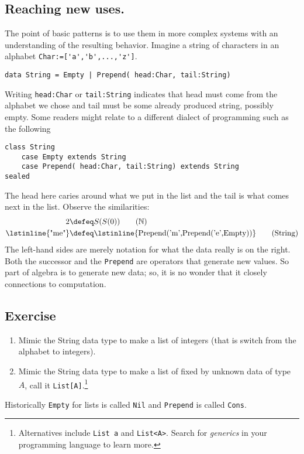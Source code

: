 \subsection{Reaching new uses.}

The point of basic patterns is to use them in more complex systems
with an understanding of the resulting behavior.  Imagine a string 
of characters in an alphabet \lstinline{Char:=['a','b',...,'z']}.
\begin{lstlisting}[language=Hidris]
data String = Empty | Prepend( head:Char, tail:String) 
\end{lstlisting}
Writing \lstinline{head:Char} or \lstinline{tail:String} 
indicates that head must come from the alphabet we chose 
and tail must be some already produced string, possibly empty.
Some readers might relate to a different dialect of 
programming such as the following
\begin{lstlisting}[language=Sava]
class String
    case Empty extends String
    case Prepend( head:Char, tail:String) extends String
sealed
\end{lstlisting}
The head here caries around what we put in the list and the tail 
is what comes next in the list.  Observe the similarities:
\begin{align}
     2 & \defeq S(S(0)) \tag{$\mathbb{N}$}\\
 \text{\lstinline{"me"}} & \defeq \text{\lstinline{Prepend('m',Prepend('e',Empty))}}
\tag{String}
\end{align}
The left-hand sides are merely notation for what the data really is on the right.
Both the successor and the \lstinline{Prepend} are operators that generate 
new values.  So part of algebra is to generate new data; so, it is no wonder 
that it closely connections to computation.

\subsection*{Exercise}
\begin{enumerate}
    \item Mimic the String data type to make a list of integers (that is 
    switch from the alphabet to integers).

    \item Mimic the String data type to make a list of fixed by 
    unknown data of type $A$, call it \lstinline{List[A]}.\footnote{
    Alternatives include \lstinline{List a} and \lstinline{List<A>}. 
    Search for \emph{generics} in your programming language to learn more.
    }

\end{enumerate}
Historically \lstinline{Empty} for lists is called \lstinline{Nil} 
and \lstinline{Prepend} is called \lstinline{Cons}.


